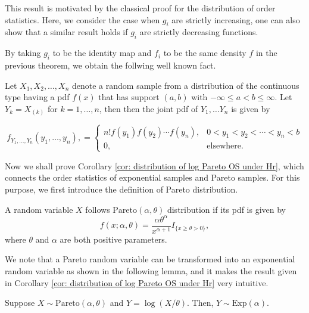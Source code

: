 \documentclass{report}
\begin{document}
\begin{rem}
  This result is motivated by the classical proof for the distribution of order statistics. Here, we consider the case when $g_i$ are strictly increasing,
  one can also show that a similar result holds if $g_i$ are strictly decreasing functions.   
\end{rem}

By taking $g_i$ to be the identity map and $f_i$ to be the same density $f$ in the previous theorem, we obtain the follwing well known fact.

\begin{cor} \label{cor: distribution of order stats}
    Let $X_1,X_2,\ldots, X_n$ denote a random sample from a distribution of the continuous
type having a pdf $f(x)$ that has support $(a,b)$ with $-\infty \leqslant a < b \leqslant \infty$. Let $Y_k = X_{(k)}$ for
$k = 1,\ldots,n$, then
then the joint pdf of $Y_1,\ldots Y_n$ is given by

\[ 
    f_{Y_1,\ldots,Y_n}(y_1,\ldots, y_n), = \begin{cases}
        n! f(y_1) f(y_2) \cdots f(y_n), & 0 < y_1 < y_2 <\cdots < y_n < b
        \\
        0, & \text{elsewhere.}
    \end{cases}
\]
\end{cor}

Now we shall prove Corollary \ref{cor: distribution of log Pareto OS under Hr},
which connects the order statistics of exponential samples and Pareto samples. For this purpose, we
first introduce the definition of Pareto distribution.
\begin{defn}
    A random variable $X$ follows $\mathrm{Pareto}(\alpha,\theta)$ distribution if its pdf is given by
    \[ 
        f(x;\alpha,\theta) = \frac{\alpha \theta^{\alpha}}{x^{\alpha +1}} I_{\{ x \geqslant \theta >0\}},
    \]
    where $\theta$ and $\alpha$ are both positive parameters.
\end{defn}

We note that a Pareto random variable can be transformed into an exponential random variable
as shown in the following lemma, and it makes the result given in Corollary \ref{cor: distribution of log Pareto OS under Hr} very intuitive.

\begin{lem} \label{lem: log of Pareto is exp}
    Suppose $X \sim \mathrm{Pareto}(\alpha,\theta)$ and $Y = \log(X/\theta)$. Then, $Y \sim \mathrm{Exp}(\alpha)$.
\end{lem}
\end{document}
